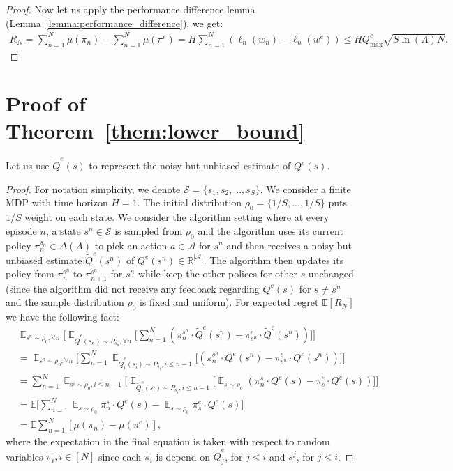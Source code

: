 \documentclass{article}
\begin{document}
\begin{proof}
Now let us apply the performance difference lemma (Lemma~\ref{lemma:performance_difference}), we get:
\begin{align}
R_N = \sum_{n=1}^N\mu(\pi_n) - \sum_{n=1}^N\mu(\pi^e) = H\sum_{n=1}^N (\ell_n(w_n) - \ell_n(w^e)) \leq HQ_{\max}^e\sqrt{S\ln(A)N}.
\end{align}

\end{proof}


\section{Proof of Theorem~\ref{them:lower_bound}}
\label{sec:proof_lower_bound}
Let us use $\tilde{Q}^e(s)$ to represent the noisy but unbiased estimate of $Q^e(s)$.
\begin{proof}
For notation simplicity, we denote $\mathcal{S} = \{s_1, s_2, ..., s_S\}$. We consider a finite MDP with time horizon $H = 1$. The initial distribution $\rho_0 = \{1/S, ..., 1/S\}$ puts $1/S$ weight on each state. 
We consider the algorithm setting where at every episode $n$, a state $s^n\in \mathcal{S}$ is sampled from $\rho_0$ and the algorithm uses its current policy $\pi_{n}^{s_n}\in\Delta({A})$ to pick an action $a\in\mathcal{A}$ for $s^n$ and then receives a noisy but unbiased estimate $\tilde{Q}^e(s^n)$ of $Q^e(s^n)\in\mathbb{R}^{|\mathcal{A}|}$. The algorithm then updates its policy from $\pi_{n}^{s^n}$ to $\pi_{n+1}^{s^n}$ for $s^n$ while keep the other polices for other $s$ unchanged (since the algorithm did not receive any feedback regarding $Q^e(s)$ for $s\neq s^{n}$ and the sample distribution $\rho_0$ is fixed and uniform). For expected regret $\mathbb{E}[R_N]$ we have the following fact:
\begin{align}
\label{eq:relation}
&\mathop{\mathbb{E}}_{s^n\sim\rho_0,\forall n}\Big[\mathop{\mathbb{E}}_{\tilde{Q}^e(s_n)\sim P_{s_n},\forall n}\big[\sum_{n=1}^N( \pi_n^{s^n}\cdot \tilde{Q}^e(s^n) - \pi^e_{s^n}\cdot \tilde{Q}^e(s^n))\big]\Big] \nonumber\\
&= \mathop{\mathbb{E}}_{s^n\sim \rho_0,\forall n}\Big[\sum_{n=1}^N\mathop{\mathbb{E}}_{\tilde{Q}^e_i(s_i)\sim P_{s_i},i\leq n-1}\big[ (\pi_n^{s^n}\cdot Q^e(s^n) - \pi_{s^n}^e\cdot Q^e(s^n))\big]\Big] \nonumber\\
& = \sum_{n=1}^N\mathop{\mathbb{E}}_{s^i\sim \rho_0,i\leq n-1}\Big[\mathop{\mathbb{E}}_{\tilde{Q}^e_i(s_i)\sim P_{s_i},i\leq n-1}\big[ \mathop{\mathbb{E}}_{s\sim\rho_0}(\pi_n^{s}\cdot Q^e(s) - \pi_{s}^e\cdot Q^e(s))\big]\Big] \nonumber\\
&= \mathbb{E}\big[\sum_{n=1}^N\mathop{\mathbb{E}}_{s\sim\rho_0}\pi_n^s\cdot Q^e(s) - \mathop{\mathbb{E}}_{s\sim \rho_0}\pi_s^e\cdot Q^e(s)\big] \nonumber\\
& = \mathbb{E}\sum_{n=1}^N [\mu(\pi_n) - \mu(\pi^e)],
\end{align}where the expectation in the final equation is taken with respect to random variables $\pi_i,i\in[N]$ since each $\pi_i$ is depend on $\tilde{Q}^e_j$, for $j< i$ and $s^j$, for $j<i$.  


\end{proof}
\end{document}
